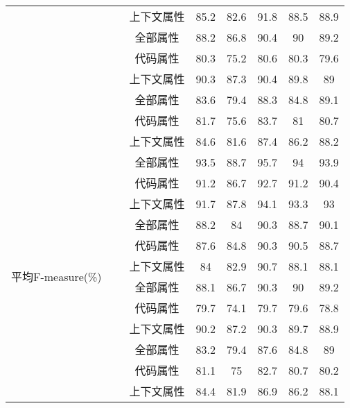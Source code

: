 \begin{table} [htbp]
\begin{tabular}{cccccccc}
&   &  上下文属性& 85.2    & 82.6  & 91.8 & 88.5 & 88.9 \\
\cline{2-8}
&~\multirow{3}{*}{jFreeChart} 
 & 全部属性 & 88.2    & 86.8  & 90.4 & 90   & 89.2 \\
&  &代码属性 & 80.3    & 75.2  & 80.6 & 80.3 & 79.6 \\
&   &  上下文属性 & 90.3    & 87.3  & 90.4 & 89.8 & 89  \\
\cline{2-8}
&~\multirow{3}{*}{Tuxguitar} 
&全部属性 & 83.6    & 79.4  & 88.3 & 84.8 & 89.1 \\
&   &代码属性 & 81.7    & 75.6  & 83.7 & 81  & 80.7 \\
&    & 上下文属性& 84.6    & 81.6  & 87.4 & 86.2 & 88.2 \\
\hline
\multirow{12}{*}{平均F-measure(\%)}
&~\multirow{3}{*}{ArgoUML}
& 全部属性 & 93.5    & 88.7  & 95.7 & 94  & 93.9 \\
 &  & 代码属性 & 91.2    & 86.7  & 92.7 & 91.2 & 90.4 \\
 &   &  上下文属性& 91.7    & 87.8  & 94.1 & 93.3 & 93  \\
\cline{2-8}
&~\multirow{3}{*}{jEdit} 
& 全部属性 & 88.2    & 84   & 90.3 & 88.7 & 90.1 \\
&   &代码属性& 87.6    & 84.8  & 90.3 & 90.5 & 88.7 \\
&   &  上下文属性& 84     & 82.9  & 90.7 & 88.1 & 88.1 \\
\cline{2-8}
&~\multirow{3}{*}{jFreeChart} 
&  全部属性& 88.1    & 86.7  & 90.3 & 90   & 89.2 \\
&  &代码属性 & 79.7    & 74.1  & 79.7 & 79.6 & 78.8 \\
&   & 上下文属性 & 90.2    & 87.2  & 90.3 & 89.7 & 88.9 \\
\cline{2-8}
&~\multirow{3}{*}{Tuxguitar} 
&全部属性 & 83.2    & 79.4  & 87.6 & 84.8 & 89  \\
&  &代码属性& 81.1    & 75   & 82.7 & 80.7 & 80.2 \\
&  & 上下文属性& 84.4    & 81.9  & 86.9 & 86.2 & 88.1\\
\bottomrule[1.5pt]
\end{tabular}
\end{table} 


